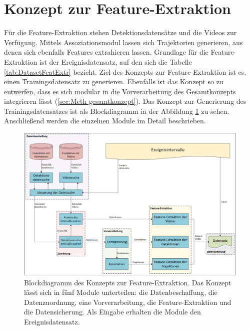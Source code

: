\section{Konzept zur Feature-Extraktion} \label{sec:Meth FeatExtr}
Für die Feature-Extraktion stehen Detektionsdatensätze und die Videos zur Verfügung. Mittels  Assoziationsmodul lassen sich Trajektorien generieren, aus denen sich ebenfalls Features extrahieren lassen. Grundlage für die Feature-Extraktion ist der Ereignisdatensatz, auf den sich die Tabelle \ref{tab:DatasetFeatExtr} bezieht. Ziel des Konzepts zur Feature-Extraktion ist es, einen Trainingsdatensatz zu generieren. Ebenfalls ist das Konzept so zu entwerfen, dass es sich modular in die Vorverarbeitung des Gesamtkonzepts integrieren lässt (\autoref{sec:Meth gesamtkonzept}). Das Konzept zur Generierung des Trainingsdatensatzes ist als Blockdiagramm in der Abbildung \ref{fig:KonzeptFeatExtr} zu sehen. Anschließend werden die einzelnen Module im Detail beschrieben.

\begin{figure}[htb]
    \centering
    \includegraphics[width=\textwidth]{img/Grafiken/Konzept Feature-Extraktion.png}
    \caption[Blockdiagramm des Konzepts zur Feature-Extraktion.]{Blockdiagramm des Konzepts zur Feature-Extraktion. Das Konzept lässt sich in fünf Module unterteilen: die Datenbeschaffung, die Datenzuordnung, eine Vorverarbeitung, die Feature-Extraktion und die Datensicherung. Als Eingabe erhalten die Module den Ereignisdatensatz.}
    \label{fig:KonzeptFeatExtr}
\end{figure}

